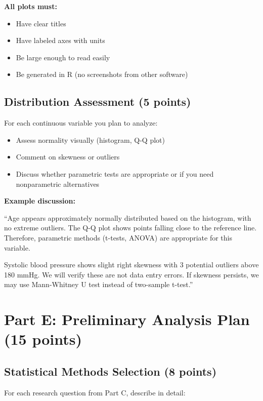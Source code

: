 \documentclass[11pt]{article}
\begin{document}
\textbf{All plots must:}
\begin{itemize}
\item Have clear titles
\item Have labeled axes with units
\item Be large enough to read easily
\item Be generated in R (no screenshots from other software)
\end{itemize}

\subsection{Distribution Assessment (5 points)}

For each continuous variable you plan to analyze:

\begin{itemize}
\item Assess normality visually (histogram, Q-Q plot)
\item Comment on skewness or outliers
\item Discuss whether parametric tests are appropriate or if you need nonparametric alternatives
\end{itemize}

\textbf{Example discussion:}

``Age appears approximately normally distributed based on the histogram, with no extreme outliers. The Q-Q plot shows points falling close to the reference line. Therefore, parametric methods (t-tests, ANOVA) are appropriate for this variable.

Systolic blood pressure shows slight right skewness with 3 potential outliers above 180 mmHg. We will verify these are not data entry errors. If skewness persists, we may use Mann-Whitney U test instead of two-sample t-test.''

\newpage

\section{Part E: Preliminary Analysis Plan (15 points)}

\subsection{Statistical Methods Selection (8 points)}

For each research question from Part C, describe in detail:
\end{document}
